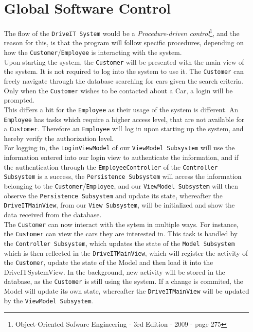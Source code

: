 \section{Global Software Control}

The flow of the \texttt{DriveIT System} would be a \textit{Procedure-driven control}\footnote{{Object-Oriented Sofware Engineering - 3rd Edition - 2009 - page 275}}, and the reason for this, is that the program will follow specific procedures, depending on how the \texttt{Customer}/\texttt{Employee} is interacting with the system.\\

Upon starting the system, the \texttt{Customer} will be presented with the main view of the system. It is not required to log into the system to use it. The \texttt{Customer} can freely navigate through the database searching for cars given the search criteria. Only when the \texttt{Customer} wishes to be contacted about a Car, a login will be prompted.\\ 

This differs a bit for the \texttt{Employee} as their usage of the system is different. An \texttt{Employee} has tasks which require a higher access level, that are not available for a \texttt{Customer}. Therefore an \texttt{Employee} will log in upon starting up the system, and hereby verify the authorization level.\\

For logging in, the \texttt{LoginViewModel} of our \texttt{ViewModel Subsystem} will use the information entered into our login view to authenticate the information, and if the authentication through the \texttt{EmployeeController} of the \texttt{Controller Subsystem} is a success, the \texttt{Persistence Subsystem} will access the information belonging to the \texttt{Customer}/\texttt{Employee}, and our \texttt{ViewModel Subsystem} will then observe the \texttt{Persistence Subsystem} and update its state, whereafter the \texttt{DriveITMainView}, from our \texttt{View Subsystem}, will be initialized and show the data received from the database.\\

The \texttt{Customer} can now interact with the sytem in multiple ways. For instance, the \texttt{Customer} can view the cars they are interested in. This task is handled by the \texttt{Controller Subsystem}, which updates the state of the \texttt{Model Subsystem} which is then reflected in the \texttt{DriveITMainView}, which will register the activity of the \texttt{Customer}, update the state of the Model and then load it into the DriveITSystemView. In the background, new activity will be stored in the database, as the \texttt{Customer} is still using the system. If a change is commited, the Model will update its own state, whereafter the \texttt{DriveITMainView} will be updated by the \texttt{ViewModel Subsystem}.\\

